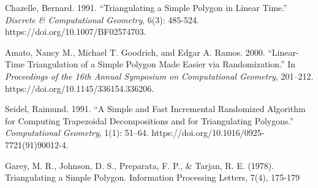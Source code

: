 \documentclass{article}
\begin{document}
\begin{thebibliography}{3}
    Chazelle, Bernard. 1991. “Triangulating a Simple Polygon in Linear Time.” \textit{Discrete \& Computational Geometry}, 6(3): 485-524. https://doi.org/10.1007/BF02574703.

    Amato, Nancy M., Michael T. Goodrich, and Edgar A. Ramos. 2000. “Linear-Time Triangulation of a Simple Polygon Made Easier via Randomization.” In \textit{Proceedings of the 16th Annual Symposium on Computational Geometry}, 201–212. https://doi.org/10.1145/336154.336206.

    Seidel, Raimund. 1991. “A Simple and Fast Incremental Randomized Algorithm for Computing Trapezoidal Decompositions and for Triangulating Polygons.” \textit{Computational Geometry}, 1(1): 51–64. https://doi.org/10.1016/0925-7721(91)90012-4.

    Garey, M. R., Johnson, D. S., Preparata, F. P., & Tarjan, R. E. (1978). Triangulating a Simple Polygon. Information Processing Letters, 7(4), 175-179
\end{thebibliography}
\end{document}
